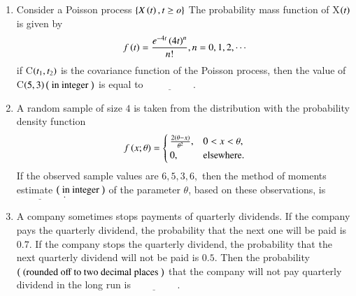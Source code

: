 \documentclass[journal]{IEEEtran}
\begin{document}
\begin{enumerate} [start=27]
\begin{align*}
    f_{X}\brak{x} = 
\begin{cases} 
\frac{1}{\sqrt{2}T\brak{\frac{1}{6}}}x^{-\frac{5}{6}}e^{-\frac{x}{8}}, & 0 < x < \infty, \\
0, & \text{elsewhere}.
\end{cases}
\end{align*}
where T$\brak{\cdot}$ denotes the gamma function. Also ,let $\Bar{X}_{n}=\frac{1}{n}\brak{X_{1}+X_{1}+\cdots+X_{n}}.$ If $\sqrt{n}\brak{\Bar{X}_{n}\brak{3-\Bar{X}_{n}}-\frac{20}{9}}$ converges to V$\brak{0,\sigma^{2}}$ in distribution,then $\sigma^{2} \brak{\text{ (rounded
off to two decimal places }}$ is equal to $\underline{\hspace{2cm}}.$
\bigskip
\item Consider a Poisson process $\left\{X\left(t\right),t\geq o\right\}$
The probability mass function of X$\left(t\right)$ is given by 
\begin{align*}
     f\left(t\right)=\frac{e^{-4t}\left(4t\right)^{n}}{n!}, n=0,1,2,\cdots
\end{align*}
if C$\left(t_{1},t_{2}\right)$ is the covariance function of the Poisson process, then the value of C$\left(5,3\right) \left(\text{ in integer }\right)$ is equal to $\underline{\hspace{2cm}}.$
\bigskip
\item A random sample of size $4$ is taken from the distribution with the probability density function 
\begin{align*}
    f\left(x;\theta\right) = 
\begin{cases} 
\frac{2\left(\theta-x\right)}{\theta^{2}}, & 0 < x < \theta, \\
0, & \text{elsewhere}.
\end{cases}
\end{align*}
If the observed sample values are $6, 5, 3, 6,$ then the method of moments estimate $\left(\text{ in integer }\right)$ of the parameter $\theta$, based on these observations, is $\underline{\hspace{2cm}}.$
\bigskip
\item A company sometimes stops payments of quarterly dividends. If the company pays the quarterly dividend, the probability that the next one will be paid is $0.7.$ If the
company stops the quarterly dividend, the probability that the next quarterly dividend will not be paid is $0.5.$ Then the probability $\left(\text{ (rounded
off to two decimal places }\right)$ that the company will not pay quarterly dividend in the long run is$\underline{\hspace{2cm}}.$

\end{enumerate}
\end{document}
